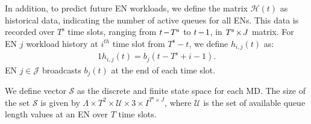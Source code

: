 \documentclass[10pt, journal,letterpaper]{IEEEtran}
\begin{document}
In addition, to predict future EN workloads, we define the matrix $\mathcal{H}(t)$ as historical data, indicating the number of active queues for all ENs. This data is recorded over $T^{\text{s}}$ time slots, ranging from $t\hspace{-0.4mm}-\hspace{-0.4mm}T^{\text{s}}$ to $t\hspace{-0.4mm}-\hspace{-0.4mm}1$, in $T^{\text{s}}\hspace{-0.4mm}\times \hspace{-0.4mm} J$ matrix. For EN $j$ workload history at $i^{th}$ time slot from $T^{\text{s}}-t$, we define $h_{i,j}(t)$ as:
\begin{alignat}{1}
	h_{i,j}(t) = b_j(t - T^{\text{s}} + i - 1).
	\label{19}
\end{alignat}
EN $j \in \mathcal{J}$ broadcasts $b_j(t)$ at the end of each time slot. %

We define vector $\mathcal{S}$ as the discrete and finite state space for each MD. The size of the set $\mathcal{S}$ is given by $\Lambda \times T^2 \times \mathcal{U} \times 3 \times I^{T^{\text{s}} \times J}$, where $\mathcal{U}$ is the set of available queue length values at an EN over $T$ time slots. 







\end{document}
